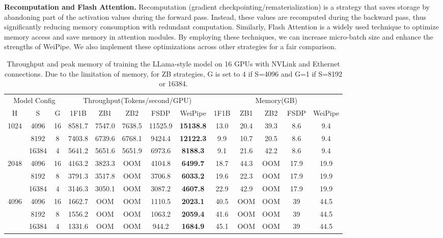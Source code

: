 \documentclass[sigplan,screen]{acmart}
\begin{document}
\textbf{Recomputation and Flash Attention.} Recomputation (gradient checkpointing/rematerialization) is a strategy that saves storage by abandoning part of the activation values during the forward pass. Instead, these values are recomputed during the backward pass, thus significantly reducing memory consumption with redundant computation. Similarly, Flash Attention\cite{dao2022flashattention} is a widely used technique to optimize memory access and save memory in attention modules. By employing these techniques, we can increase micro-batch size and enhance the strengths of WeiPipe. We also implement these optimizations across other strategies for a fair comparison.



\begin{table}[!ht]
\centering
\caption{Throughput and peak memory of training the LLama-style model on 16 GPUs with NVLink and Ethernet connections. Due to the limitation of memory, for ZB strategies, G is set to 4 if S=4096 and G=1 if S=8192 or 16384.}
\begin{tabular}{ccc|ccccc|ccccc}
\hline
\multicolumn{3}{c|}{Model Config}  & \multicolumn{5}{c|}{Throughput(Tokens/second/GPU)} & \multicolumn{5}{c}{Memory(GB)}   \\
H                     & S     & G  & 1F1B   & ZB1    & ZB2    & FSDP  & WeiPipe            & 1F1B & ZB1  & ZB2  & FSDP & WeiPipe  \\ \hline
\multirow{3}{*}{1024} & 4096  & 16 & 8581.7 & 7547.0 & 7638.5 & 11525.9 & \textbf{15138.8} & 13.0 & 20.4 & 39.3 & 8.6  & 9.4  \\
                      & 8192 & 8  & 7403.8 & 6739.6 & 6768.1 & 9424.4 & \textbf{12122.3}& 9.9  & 10.7 & 20.5 & 8.6  & 9.4  \\
                      & 16384 & 4  & 5641.2 & 5651.6 & 5651.9 & 6973.6 & \textbf{8188.3}   & 9.1  & 21.6 & 42.2 & 8.6  & 9.4  \\ \hline
\multirow{3}{*}{2048} & 4096  & 16 &  4163.2 & 3823.3 & OOM & 4104.8 & \textbf{6499.7}   & 18.7 & 44.3 & OOM  & 17.9 & 19.9 \\
                      & 8192  & 8  & 3791.3 & 3517.8 & OOM & 3706.8 & \textbf{6033.2} & 19.6 & 22.3 & OOM  & 17.9 & 19.9 \\
                      & 16384 & 4  & 3146.3 & 3050.1 & OOM & 3087.2 & \textbf{4607.8} & 22.9 & 42.9 & OOM  & 17.9 & 19.9 \\ \hline
\multirow{3}{*}{4096} & 4096  & 16 & 1662.7 & OOM & OOM & 1110.5 & \textbf{2023.1} & 40.5 & OOM  & OOM  & 39   & 44.5 \\
                      & 8192  & 8  & 1556.2 & OOM & OOM & 1063.2 & \textbf{2059.4} & 41.6 & OOM  & OOM  & 39   & 44.5 \\
                      & 16384 & 4  & 1331.6 & OOM & OOM & 944.2 & \textbf{1684.9}  & 45.1 & OOM  & OOM  & 39   & 44.5 \\ \hline
\end{tabular}
\label{tab:perform_nvlink}
\end{table}
\end{document}
